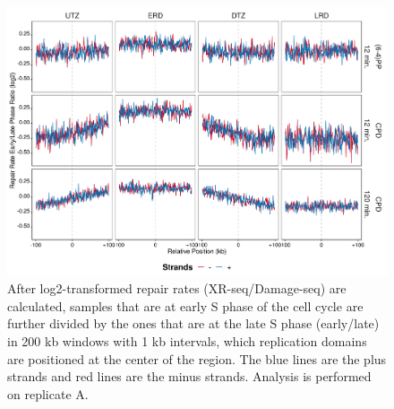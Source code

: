 \begin{figure}[H]
\begin{center}
\includegraphics[width=\textwidth]{Chapters/7_appendix/figures/supfig26}
\caption[Repair rate early/late phase ratio of replication domains in 200 kb (replicate A).]{After log2-transformed repair rates (XR-seq/Damage-seq) are calculated, samples that are at early S phase of the cell cycle are further divided by the ones that are at the late S phase (early/late) in 200 kb windows with 1 kb intervals, which replication domains are positioned at the center of the region. The blue lines are the plus strands and red lines are the minus strands. Analysis is performed on replicate A.}
\label{supfig:rrel200repdomainA}
\end{center}
\end{figure}

